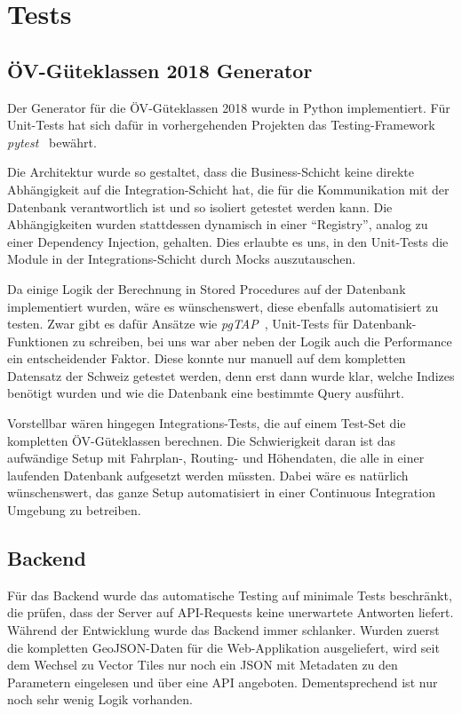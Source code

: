 \section{Tests}
\label{Tests}


\subsection{ÖV-Güteklassen 2018 Generator}
\label{Tests:ÖV-Güteklassen 2018 Generator}

Der Generator für die \acs{ÖV}-Güteklassen 2018 wurde in Python implementiert.
Für Unit-Tests hat sich dafür in vorhergehenden Projekten das Testing-Framework \emph{pytest}~\cite{pytest} bewährt.

Die Architektur wurde so gestaltet, dass die Business-Schicht keine direkte Abhängigkeit auf die Integration-Schicht hat, die für die Kommunikation mit der Datenbank verantwortlich ist und so isoliert getestet werden kann.
Die Abhängigkeiten wurden stattdessen dynamisch in einer "`Registry"', analog zu einer Dependency Injection, gehalten.
Dies erlaubte es uns, in den Unit-Tests die Module in der Integrations-Schicht durch Mocks auszutauschen.

Da einige Logik der Berechnung in Stored Procedures auf der Datenbank implementiert wurden, wäre es wünschenswert, diese ebenfalls automatisiert zu testen.
Zwar gibt es dafür Ansätze wie \emph{pgTAP}~\cite{pgTAP}, Unit-Tests für Datenbank-Funktionen zu schreiben, bei uns war aber neben der Logik auch die Performance ein entscheidender Faktor.
Diese konnte nur manuell auf dem kompletten Datensatz der Schweiz getestet werden, denn erst dann wurde klar, welche Indizes benötigt wurden und wie die Datenbank eine bestimmte Query ausführt.

Vorstellbar wären hingegen Integrations-Tests, die auf einem Test-Set die kompletten \acs{ÖV}-Güteklassen berechnen.
Die Schwierigkeit daran ist das aufwändige Setup mit Fahrplan-, Routing- und Höhendaten, die alle in einer laufenden Datenbank aufgesetzt werden müssten.
Dabei wäre es natürlich wünschenswert, das ganze Setup automatisiert in einer Continuous Integration Umgebung zu betreiben.

\subsection{Backend}
\label{Tests:Backend}

Für das Backend wurde das automatische Testing auf minimale Tests beschränkt, die prüfen, dass der Server auf API-Requests keine unerwartete Antworten liefert.
Während der Entwicklung wurde das Backend immer schlanker.
Wurden zuerst die kompletten GeoJSON-Daten für die Web-Applikation ausgeliefert, wird seit dem Wechsel zu Vector Tiles nur noch ein JSON mit Metadaten zu den Parametern eingelesen und über eine API angeboten.
Dementsprechend ist nur noch sehr wenig Logik vorhanden.

